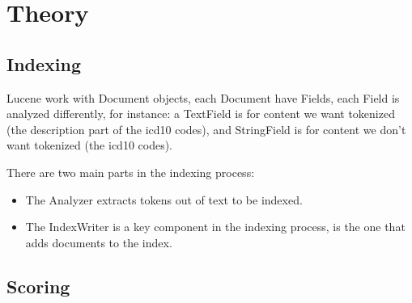 \chapter{Theory}
\label{cha:theory}

\section{Indexing}
\label{sec:indexing}

Lucene work with Document objects, each Document have Fields, each Field is
analyzed differently, for instance: a TextField is for content we want tokenized
(the description part of the icd10 codes), and StringField is for content we
don't want tokenized (the icd10 codes).

There are two main parts in the indexing process:

\begin{itemize}
\item The Analyzer extracts tokens out of text to be indexed.

\item The IndexWriter is a key component in the indexing process, is the one
      that adds documents to the index.
\end{itemize}


\section{Scoring}
\label{sec:scoring}

